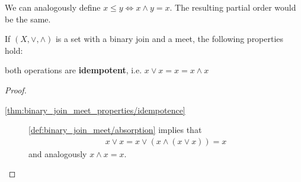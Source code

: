 \begin{note}\label{note:binary_join_meet_order}
  We can analogously define \( x \leq y \iff x \land y = x \). The resulting partial order would be the same.
\end{note}

\begin{proposition}\label{thm:binary_join_meet_properties}
  If \( (X, \lor, \land) \) is a set with a binary join and a meet, the following properties hold:
  \begin{defenum}
    \item\label{thm:binary_join_meet_properties/idempotence} both operations are \textbf{idempotent}, i.e. \( x \lor x = x = x \land x \)
  \end{defenum}
\end{proposition}
\begin{proof}
  \begin{description}
    \item[\ref{thm:binary_join_meet_properties/idempotence}] \ref{def:binary_join_meet/absorption} implies that
    \begin{align*}
      x \lor x = x \lor (x \land (x \lor x)) = x
    \end{align*}
    and analogously \( x \land x = x \).
  \end{description}
\end{proof}

